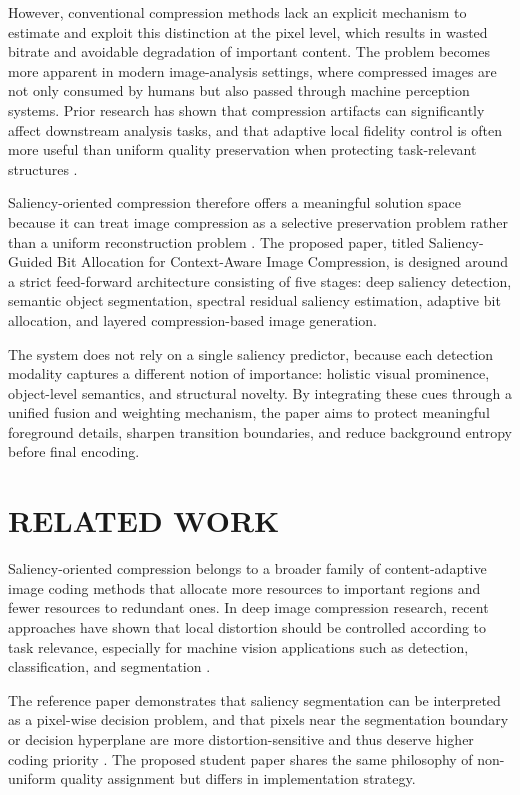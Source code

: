 \documentclass[11pt,                                                             
 superscriptaddress,twoside,
 amsmath,amssymb,
 aps, physrev
]{revtex4-2}
\begin{document}
However, conventional compression methods lack an explicit mechanism to estimate and exploit this distinction at the pixel level, which results in wasted bitrate and avoidable degradation of important content. The problem becomes more apparent in modern image-analysis settings, where compressed images are not only consumed by humans but also passed through machine perception systems. Prior research has shown that compression artifacts can significantly affect downstream analysis tasks, and that adaptive local fidelity control is often more useful than uniform quality preservation when protecting task-relevant structures \cite{he2021acm, xu2022acm}.

Saliency-oriented compression therefore offers a meaningful solution space because it can treat image compression as a selective preservation problem rather than a uniform reconstruction problem \cite{li2024ieee}. The proposed paper, titled Saliency-Guided Bit Allocation for Context-Aware Image Compression, is designed around a strict feed-forward architecture consisting of five stages: deep saliency detection, semantic object segmentation, spectral residual saliency estimation, adaptive bit allocation, and layered compression-based image generation.

The system does not rely on a single saliency predictor, because each detection modality captures a different notion of importance: holistic visual prominence, object-level semantics, and structural novelty. By integrating these cues through a unified fusion and weighting mechanism, the paper aims to protect meaningful foreground details, sharpen transition boundaries, and reduce background entropy before final encoding.

\section{RELATED WORK}
Saliency-oriented compression belongs to a broader family of content-adaptive image coding methods that allocate more resources to important regions and fewer resources to redundant ones. In deep image compression research, recent approaches have shown that local distortion should be controlled according to task relevance, especially for machine vision applications such as detection, classification, and segmentation \cite{he2021acm, xu2022acm}.

The reference paper demonstrates that saliency segmentation can be interpreted as a pixel-wise decision problem, and that pixels near the segmentation boundary or decision hyperplane are more distortion-sensitive and thus deserve higher coding priority \cite{li2024ieee}. The proposed student paper shares the same philosophy of non-uniform quality assignment but differs in implementation strategy.
\end{document}
